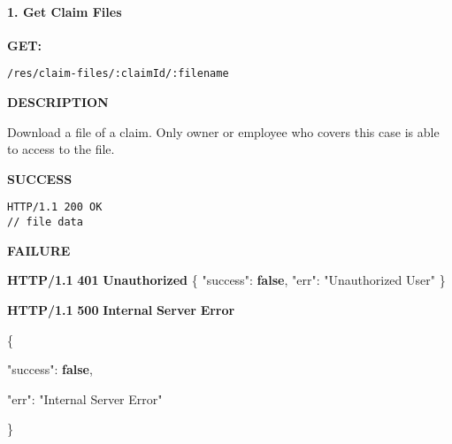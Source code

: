 \documentclass[
]{article}
\newenvironment{Shaded}{}{}
\newcommand{\DataTypeTok}[1]{\textcolor[rgb]{0.56,0.13,0.00}{#1}}
\newcommand{\ErrorTok}[1]{\textcolor[rgb]{1.00,0.00,0.00}{\textbf{#1}}}
\newcommand{\FunctionTok}[1]{\textcolor[rgb]{0.02,0.16,0.49}{#1}}
\newcommand{\KeywordTok}[1]{\textcolor[rgb]{0.00,0.44,0.13}{\textbf{#1}}}
\newcommand{\StringTok}[1]{\textcolor[rgb]{0.25,0.44,0.63}{#1}}
\begin{document}
\hypertarget{header-n1007}{%
\paragraph{1. Get Claim Files}\label{header-n1007}}

\textbf{GET:}

\begin{verbatim}
/res/claim-files/:claimId/:filename
\end{verbatim}

\textbf{DESCRIPTION}

Download a file of a claim. Only owner or employee who covers this case
is able to access to the file.

\textbf{SUCCESS}

\begin{verbatim}
HTTP/1.1 200 OK
// file data
\end{verbatim}

\textbf{FAILURE}

\begin{Shaded}
\begin{Highlighting}[]
\ErrorTok{HTTP/1.1} \ErrorTok{401} \ErrorTok{Unauthorized}
\FunctionTok{\{}
    \DataTypeTok{"success"}\FunctionTok{:} \KeywordTok{false}\FunctionTok{,}
    \DataTypeTok{"err"}\FunctionTok{:} \StringTok{"Unauthorized User"}
\FunctionTok{\}}
\end{Highlighting}
\end{Shaded}

\begin{Shaded}
\begin{Highlighting}[]
\ErrorTok{HTTP/1.1} \ErrorTok{500} \ErrorTok{Internal} \ErrorTok{Server} \ErrorTok{Error}

\FunctionTok{\{}

    \DataTypeTok{"success"}\FunctionTok{:} \KeywordTok{false}\FunctionTok{,}

    \DataTypeTok{"err"}\FunctionTok{:} \StringTok{"Internal Server Error"}

\FunctionTok{\}}
\end{Highlighting}
\end{Shaded}
\end{document}
